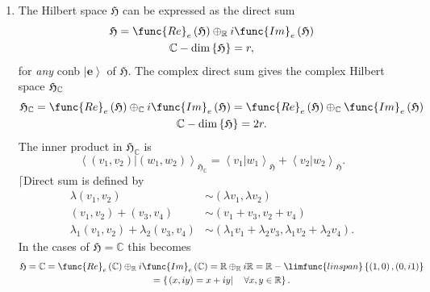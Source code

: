 \documentclass[aps,preprint]{revtex4}
\begin{document}
\begin{enumerate}
\item The Hilbert space $\mathfrak{H}$ can be expressed as the direct sum 
\begin{gather}
\mathfrak{H}=\func{Re}_{e}\left( \mathfrak{H}\right) \oplus _{\mathbb{R}}i%
\func{Im}_{e}\left( \mathfrak{H}\right) \\
\mathbb{C}-\dim \left\{ \mathfrak{H}\right\} =r,
\end{gather}%
for \emph{any} conb $\left\vert \mathbf{e}\right\rangle $ of $\mathfrak{H.}$
The complex direct sum gives the complex Hilbert space $\mathfrak{H}_{%
\mathbb{C}}$ 
\begin{gather}
\mathfrak{H}_{\mathbb{C}}=\func{Re}_{e}\left( \mathfrak{H}\right) \oplus _{%
\mathbb{C}}i\func{Im}_{e}\left( \mathfrak{H}\right) =\func{Re}_{e}\left( 
\mathfrak{H}\right) \oplus _{\mathbb{C}}\func{Im}_{e}\left( \mathfrak{H}%
\right) \\
\mathbb{C}-\dim \left\{ \mathfrak{H}\right\} =2r.
\end{gather}%
The inner product in $\mathfrak{H}_{\mathbb{C}}$ is 
\begin{equation}
\left\langle \left. \left( v_{1},v_{2}\right) \right\vert \left(
w_{1},w_{2}\right) \right\rangle _{\mathfrak{H}_{\mathbb{C}}}=\left\langle
\left. v_{1}\right\vert w_{1}\right\rangle _{\mathfrak{H}}+\left\langle
\left. v_{2}\right\vert w_{2}\right\rangle _{\mathfrak{H}}.
\end{equation}%
$\lceil $Direct sum is defined by 
\begin{align}
\lambda \left( v_{1},v_{2}\right) & \sim \left( \lambda v_{1},\lambda
v_{2}\right) \\
\left( v_{1},v_{2}\right) +\left( v_{3},v_{4}\right) & \sim \left(
v_{1}+v_{3},v_{2}+v_{4}\right) \\
\lambda _{1}\left( v_{1},v_{2}\right) +\lambda _{2}\left( v_{3},v_{4}\right)
& \sim \left( \lambda _{1}v_{1}+\lambda _{2}v_{3},\lambda _{1}v_{2}+\lambda
_{2}v_{4}\right) .
\end{align}%
In the cases of $\mathfrak{H}=\mathbb{C}$ this becomes 
\begin{gather}
\mathfrak{H}=\mathbb{C}=\func{Re}_{e}\left( \mathbb{C}\right) \oplus _{%
\mathbb{R}}i\func{Im}_{e}\left( \mathbb{C}\right) =\mathbb{R}\oplus _{%
\mathbb{R}}i\mathbb{R}=\mathbb{R}-\limfunc{linspan}\left\{ \left( 1,0\right)
,\left( 0,i1\right) \right\} \\
=\left\{ \left. \left( x,iy\right) =x+iy\right\vert \quad \forall x,y\in 
\mathbb{R}\right\} .
\end{gather}%

\end{enumerate}
\end{document}
